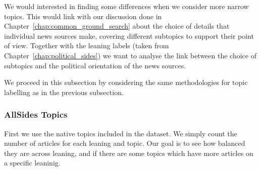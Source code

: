 We would interested in finding some differences when we consider more narrow topics. This would link with our discussion done in Chapter~\ref{chap:common_ground_search} about the choice of details that individual news sources make, covering different subtopics to support their point of view.
Together with the leaning labels (taken from Chapter~\ref{chap:political_sides}) we want to analyse the link between the choice of subtopics and the political orientation of the news sources.




We proceed in this subsection by considering the same methodologies for topic labelling as in the previous subsection.

\subsubsection{\statusgreen AllSides Topics}

First we use the native topics included in the dataset. We simply count the number of articles for each leaning and topic. Our goal is to see how balanced they are across leaning, and if there are some topics which have more articles on a specific leaninig.

